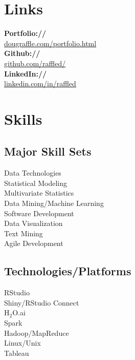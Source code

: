 \documentclass[letterpaper]{deedy-resume} %
\begin{document}
\begin{minipage}[t]{0.33\textwidth}
\section{Links} 
{\bf Portfolio://}\\ \href{http://www.dougraffle.com/portfolio.html}{dougraffle.com/portfolio.html}\\
{\bf Github://}\\ \href{http://github.com/raffled/}{github.com/raffled/}\\
{\bf LinkedIn://}\\ \href{https://www.linkedin.com/in/raffled}{linkedin.com/in/raffled} \\
\sectionspace %


\section{Skills}
\subsection{Major Skill Sets}
Data Technologies\\
Statistical Modeling\\
Multivariate Statistics\\
Data Mining/Machine Learning\\
Software Development\\
Data Visualization\\
Text Mining\\
Agile Development\\

\sectionspace %
\vspace{3pt}

\subsection{Technologies/Platforms}
RStudio\\
Shiny/RStudio Connect\\
H$_2$O.ai\\
Spark\\
Hadoop/MapReduce\\
Linux/Unix\\
Tableau


\end{minipage}
\end{document}
